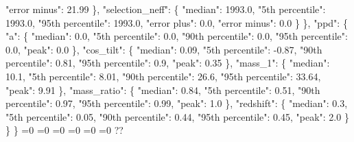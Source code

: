 {{          "error minus": 21.99%
        \}, %
        "selection\_neff": \{%
          "median": 1993.0, %
          "5th percentile": 1993.0, %
          "95th percentile": 1993.0, %
          "error plus": 0.0, %
          "error minus": 0.0%
        \}%
      \}, %
      "ppd": \{%
        "a": \{%
          "median": 0.0, %
          "5th percentile": 0.0, %
          "90th percentile": 0.0, %
          "95th percentile": 0.0, %
          "peak": 0.0%
        \}, %
        "cos\_tilt": \{%
          "median": 0.09, %
          "5th percentile": {-}0.87, %
          "90th percentile": 0.81, %
          "95th percentile": 0.9, %
          "peak": 0.35%
        \}, %
        "mass\_1": \{%
          "median": 10.1, %
          "5th percentile": 8.01, %
          "90th percentile": 26.6, %
          "95th percentile": 33.64, %
          "peak": 9.91%
        \}, %
        "mass\_ratio": \{%
          "median": 0.84, %
          "5th percentile": 0.51, %
          "90th percentile": 0.97, %
          "95th percentile": 0.99, %
          "peak": 1.0%
        \}, %
        "redshift": \{%
          "median": 0.3, %
          "5th percentile": 0.05, %
          "90th percentile": 0.44, %
          "95th percentile": 0.45, %
          "peak": 2.0%
        \}%
      \}%
    \}}%
  \else%
    \ifnum{}=0%
      \def\MagBetaUnconstrainedIidTiltIsotropicTruncnormNid@out{%
    {-}1034.58}%
    \else%
      \ifnum{}=0%
      \def\MagBetaUnconstrainedIidTiltIsotropicTruncnormNid@out{%
    0.26}%
    \else%
      \ifnum{}=0%
      \def\MagBetaUnconstrainedIidTiltIsotropicTruncnormNid@out{%
    {-}2.28}%
    \else%
      \ifnum{}=0%
      \def\MagBetaUnconstrainedIidTiltIsotropicTruncnormNid@out{%
    {-}1.64}%
    \else%
      \ifnum{}=0%
      \let\MagBetaUnconstrainedIidTiltIsotropicTruncnormNid@out\MagBetaUnconstrainedIidTiltIsotropicTruncnormNid@I%
    \else%
      \ifnum{}=0%
      \let\MagBetaUnconstrainedIidTiltIsotropicTruncnormNid@out\MagBetaUnconstrainedIidTiltIsotropicTruncnormNid@II%
    \else%
      \def\MagBetaUnconstrainedIidTiltIsotropicTruncnormNid@out{%
    ??}%
    \fi\fi\fi\fi\fi\fi
  \fi
  \MagBetaUnconstrainedIidTiltIsotropicTruncnormNid@out
}\newcommand\MagBetaUnconstrainedIidTiltIsotropicTruncnormNid@I[1][all]{%
  \ifnum\pdfstrcmp{#1}{all}=0%
    \def\MagBetaUnconstrainedIidTiltIsotropicTruncnormNid@I@out{%
    \{%
      "alpha\_1": \{%
        "median": 1.83, %
        "5th percentile": 0.04, %
}}
